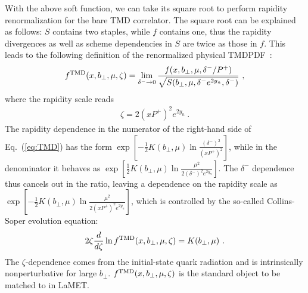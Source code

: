 With the above soft function, we can take its square root to perform rapidity renormalization for the bare TMD correlator. The square root can be explained as follows: $S$ contains two staples, while $f$ contains one, thus the rapidity divergences as well as scheme dependencies in $S$ are twice as those in $f$. This leads to the following definition of the renormalized physical TMDPDF~\cite{Echevarria:2012js,Collins:2012uy}:
\begin{align}\label{eq:TMD}
	f^{\rm TMD}(x,b_\perp,\mu,\zeta)=\lim_{\delta^- \rightarrow 0}\frac{f(x,b_\perp,\mu,\delta^-/P^+)}{\sqrt{S(b_\perp,\mu,\delta^- e^{2y_n},\delta^-)}} \ ,
\end{align}
where the rapidity scale reads
\begin{align} \label{zeta}
	\zeta=2(xP^+)^2 e^{2y_n} \ .
\end{align}
The rapidity dependence in the numerator of the right-hand side of Eq.~(\ref{eq:TMD}) has the form $\exp[-\frac{1}{2}K(b_\perp,\mu)\ln \frac{(\delta^-)^2}{(xP^+)^2}]$, while in the denominator it behaves as $\exp[\frac{1}{2}K(b_\perp,\mu)\ln \frac{\mu^2}{2(\delta^-)^2e^{2y_n}}]$. The $\delta^-$ dependence thus cancels out in the ratio, leaving a dependence on the rapidity scale as $\exp[-\frac{1}{2}K(b_\perp,\mu)\ln \frac{\mu^2}{2(xP^+)^2e^{2y_n}}]$, which is controlled by the so-called Collins-Soper evolution equation:
\begin{align}\label{eq:cs}
	2\zeta \frac{d}{d\zeta} \ln  f^{\rm TMD}(x,b_\perp,\mu,\zeta)=K(b_\perp,\mu) \ .
\end{align}
The $\zeta$-dependence comes from the initial-state quark radiation and is intrinsically nonperturbative for large $b_\perp$. $f^{\rm TMD}(x,b_\perp,\mu,\zeta)$ is the standard object to be matched to in LaMET.


